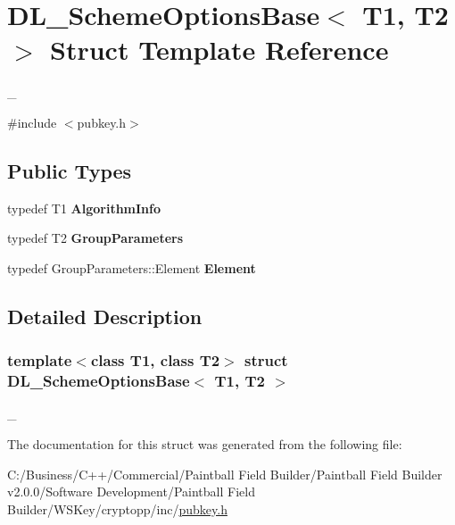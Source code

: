 \hypertarget{struct_d_l___scheme_options_base}{
\section{DL\_\-SchemeOptionsBase$<$ T1, T2 $>$ Struct Template Reference}
\label{struct_d_l___scheme_options_base}
}


\_\-  


{\ttfamily \#include $<$pubkey.h$>$}\subsection*{Public Types}
\begin{DoxyCompactItemize}
\item 
\hypertarget{struct_d_l___scheme_options_base_adee5c08b9efc2e2e3d218f1025123eb8}{
typedef T1 {\bfseries AlgorithmInfo}}
\label{struct_d_l___scheme_options_base_adee5c08b9efc2e2e3d218f1025123eb8}

\item 
\hypertarget{struct_d_l___scheme_options_base_a3a6c748ef53da4ac9a7213c70176e9b6}{
typedef T2 {\bfseries GroupParameters}}
\label{struct_d_l___scheme_options_base_a3a6c748ef53da4ac9a7213c70176e9b6}

\item 
\hypertarget{struct_d_l___scheme_options_base_aa977f7bf4cd52fe92e21d24aadccd99b}{
typedef GroupParameters::Element {\bfseries Element}}
\label{struct_d_l___scheme_options_base_aa977f7bf4cd52fe92e21d24aadccd99b}

\end{DoxyCompactItemize}


\subsection{Detailed Description}
\subsubsection*{template$<$class T1, class T2$>$ struct DL\_\-SchemeOptionsBase$<$ T1, T2 $>$}

\_\- 

The documentation for this struct was generated from the following file:\begin{DoxyCompactItemize}
\item 
C:/Business/C++/Commercial/Paintball Field Builder/Paintball Field Builder v2.0.0/Software Development/Paintball Field Builder/WSKey/cryptopp/inc/\hyperlink{pubkey_8h}{pubkey.h}\end{DoxyCompactItemize}
